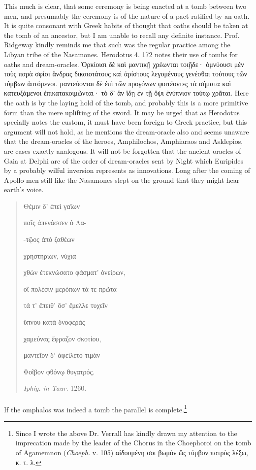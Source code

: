 \documentclass[a4paper, 11pt, oneside, polutonikogreek, english]{article}
\begin{document}
This much is clear, that some ceremony is being enacted at a tomb between two men, and presumably the ceremony is of the nature of a pact ratified by an oath. It is quite consonant with Greek habits of thought that oaths should be taken at the tomb of an ancestor, but I am unable to recall any definite instance. Prof. Ridgeway kindly reminds me that such was the regular practice among the Libyan tribe of the Nasamones. Herodotus 4. 172 notes their use of tombs for oaths and dream-oracles. Ὁρκίοισι δὲ καὶ μαντικῇ χρέωνται τοιῇδε· ὀμνύουσι μὲν τοὺς παρὰ σφίσι ἄνδρας δικαιοτάτους καὶ ἀρίστους λεγομένους γενέσθαι τούτους τῶν τύμβων ἁπτόμενοι. μαντεύονται δὲ ἐπὶ τῶν προγόνων φοιτέοντες τὰ σήματα καὶ κατευξάμενοι ἐπικατακοιμῶνται· τὸ δ' ἂν ἴδῃ ἐν τῇ ὄψι ἐνύπνιον τούτῳ χρᾶται. Here the oath is by the laying hold of the tomb, and probably this is a more primitive form than the mere uplifting of the sword. It may be urged that as Herodotus specially notes the custom, it must have been foreign to Greek practice, but this argument will not hold, as he mentions the dream-oracle also and seems unaware that the dream-oracles of the heroes, Amphilochos, Amphiaraos and Asklepios, are cases exactly analogous. It will not be forgotten that the ancient oracles of Gaia at Delphi are of the order of dream-oracles sent by Night which Euripides by a probably wilful inversion represents as innovations. Long after the coming of Apollo men still like the Nasamones slept on the ground that they might hear earth's voice.
\begin{quotation}
\large
Θέμιν δ' ἐπεὶ γαΐων

παῖς ἀπενάσσεν ὁ Λα-

-τῷος ἀπὸ ζαθέων

χρηστηρίων, νύχια

χθὼν ἐτεκνώσατο φάσματ' ὀνείρων,

οἳ πολέσιν μερόπων τά τε πρῶτα

τά τ' ἔπειθ' ὅσ' ἔμελλε τυχεῖν

ὕπνου κατὰ δνοφερὰς

χαμεύνας ἔφραζον σκοτίου,

μαντεῖον δ' ἀφείλετο τιμὰν

Φοῖβον φθόνῳ θυγατρός.

\hspace*{20mm}\emph{Iphig. in Taur.} 1260.
\end{quotation}
\paragraph{}
If the omphalos was indeed a tomb the parallel is complete.\footnote{Since I wrote the above Dr. Verrall has kindly drawn my attention to the imprecation made by the leader of the Chorus in the Choephoroi on the tomb of Agamemnon (\emph{Choeph.} v. 105) αἰδουμένη σοι βωμὸν ὣς τύμβον πατρὸς λέξω, κ. τ. λ.}
\end{document}
